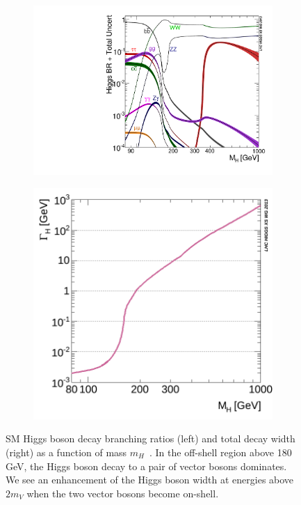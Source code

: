 \begin{figure}[!h]
\centering
\begin{subfigure}[t]{0.45\textwidth}
    \includegraphics[width=\textwidth]{figures/Higgs_BR.pdf}
    \label{fig:HiggsBR}
\end{subfigure}
\begin{subfigure}[t]{0.45\textwidth}
    \includegraphics[width=\textwidth]{figures/SM_Width.png}
    \label{fig:SMwidth}
\end{subfigure}
\caption{SM Higgs boson decay branching ratios (left) and total decay width (right) as a function of mass $m_{H}$~\cite{YR4}. In the off-shell region above 180 GeV, the Higgs boson decay to a pair of vector bosons dominates. We see an enhancement of the Higgs boson width at energies above $2m_V$ when the two vector bosons become on-shell.}
\end{figure}
\label{fig:HiggsDecay}

